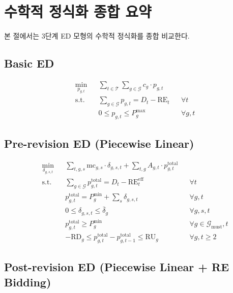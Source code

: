 \documentclass[11pt, a4paper]{article}
\begin{document}
\section{수학적 정식화 종합 요약}\label{sec:summary}

본 절에서는 3단계 ED 모형의 수학적 정식화를 종합 비교한다.

\subsection{Basic ED}

\begin{align}
    &\min_{p_{g,t}} && \sum_{t \in \mathcal{T}} \sum_{g \in \mathcal{G}} c_g \cdot p_{g,t} \tag{B1} \\
    &\text{s.t.} && \sum_{g \in \mathcal{G}} p_{g,t} = D_t - \text{RE}_t && \forall t \tag{B2} \\
    & && 0 \leq p_{g,t} \leq P_g^{\max} && \forall g, t \tag{B3}
\end{align}

\subsection{Pre-revision ED (Piecewise Linear)}

\begin{align}
    &\min_{\delta_{g,s,t}} && \sum_{t,g,s} \text{mc}_{g,s} \cdot \delta_{g,s,t}
        + \sum_{t,g} A_{g,t} \cdot p_{g,t}^{\text{total}} \tag{P2'} \\
    &\text{s.t.} && \sum_{g \in \mathcal{G}} p_{g,t}^{\text{total}} = D_t - \text{RE}_t^{\text{eff}} && \forall t \tag{P3} \\
    & && p_{g,t}^{\text{total}} = P_g^{\min} + \textstyle\sum_s \delta_{g,s,t} && \forall g, t \\
    & && 0 \leq \delta_{g,s,t} \leq \bar{\delta}_g && \forall g, s, t \\
    & && p_{g,t}^{\text{total}} \geq P_g^{\min} && \forall g \in \mathcal{G}_{\text{must}}, t \tag{P4} \\
    & && -\text{RD}_g \leq p_{g,t}^{\text{total}} - p_{g,t-1}^{\text{total}} \leq \text{RU}_g && \forall g, t \geq 2 \tag{P5}
\end{align}

\subsection{Post-revision ED (Piecewise Linear + RE Bidding)}
\end{document}
